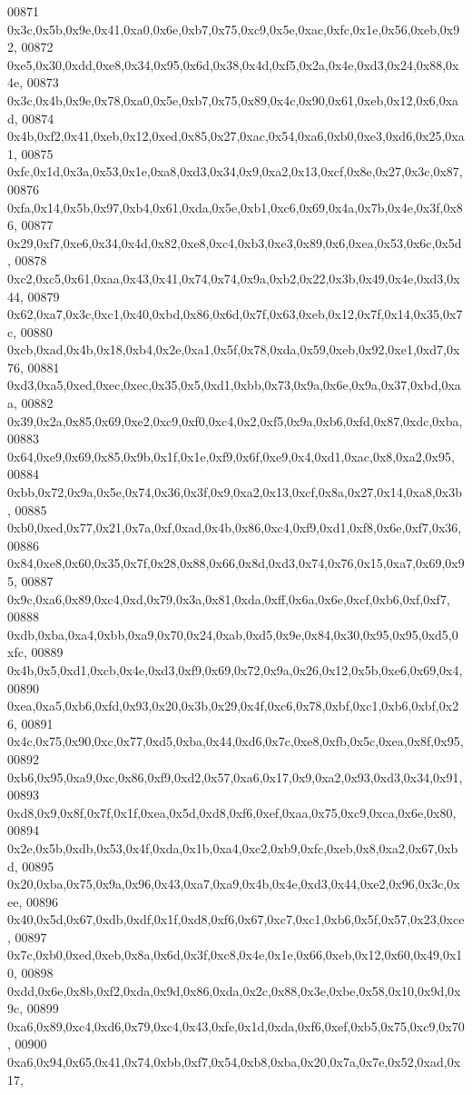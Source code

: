 \begin{DoxyCode}
00871   0x3c,0x5b,0x9e,0x41,0xa0,0x6e,0xb7,0x75,0xc9,0x5e,0xac,0xfc,0x1e,0x56,0xeb,0x92,
00872   0xe5,0x30,0xdd,0xe8,0x34,0x95,0x6d,0x38,0x4d,0xf5,0x2a,0x4e,0xd3,0x24,0x88,0x4e,
00873   0x3c,0x4b,0x9e,0x78,0xa0,0x5e,0xb7,0x75,0x89,0x4c,0x90,0x61,0xeb,0x12,0x6,0xad,
00874   0x4b,0xf2,0x41,0xeb,0x12,0xed,0x85,0x27,0xac,0x54,0xa6,0xb0,0xe3,0xd6,0x25,0xa1,
00875   0xfc,0x1d,0x3a,0x53,0x1e,0xa8,0xd3,0x34,0x9,0xa2,0x13,0xcf,0x8e,0x27,0x3c,0x87,
00876   0xfa,0x14,0x5b,0x97,0xb4,0x61,0xda,0x5e,0xb1,0xc6,0x69,0x4a,0x7b,0x4e,0x3f,0x86,
00877   0x29,0xf7,0xe6,0x34,0x4d,0x82,0xe8,0xc4,0xb3,0xe3,0x89,0x6,0xea,0x53,0x6c,0x5d,
00878   0xc2,0xc5,0x61,0xaa,0x43,0x41,0x74,0x74,0x9a,0xb2,0x22,0x3b,0x49,0x4e,0xd3,0x44,
00879   0x62,0xa7,0x3c,0xc1,0x40,0xbd,0x86,0x6d,0x7f,0x63,0xeb,0x12,0x7f,0x14,0x35,0x7c,
00880   0xcb,0xad,0x4b,0x18,0xb4,0x2e,0xa1,0x5f,0x78,0xda,0x59,0xeb,0x92,0xe1,0xd7,0x76,
00881   0xd3,0xa5,0xed,0xec,0xec,0x35,0x5,0xd1,0xbb,0x73,0x9a,0x6e,0x9a,0x37,0xbd,0xaa,
00882   0x39,0x2a,0x85,0x69,0xe2,0xc9,0xf0,0xc4,0x2,0xf5,0x9a,0xb6,0xfd,0x87,0xdc,0xba,
00883   0x64,0xe9,0x69,0x85,0x9b,0x1f,0x1e,0xf9,0x6f,0xe9,0x4,0xd1,0xac,0x8,0xa2,0x95,
00884   0xbb,0x72,0x9a,0x5e,0x74,0x36,0x3f,0x9,0xa2,0x13,0xcf,0x8a,0x27,0x14,0xa8,0x3b,
00885   0xb0,0xed,0x77,0x21,0x7a,0xf,0xad,0x4b,0x86,0xc4,0xf9,0xd1,0xf8,0x6e,0xf7,0x36,
00886   0x84,0xe8,0x60,0x35,0x7f,0x28,0x88,0x66,0x8d,0xd3,0x74,0x76,0x15,0xa7,0x69,0x95,
00887   0x9c,0xa6,0x89,0xc4,0xd,0x79,0x3a,0x81,0xda,0xff,0x6a,0x6e,0xcf,0xb6,0xf,0xf7,
00888   0xdb,0xba,0xa4,0xbb,0xa9,0x70,0x24,0xab,0xd5,0x9e,0x84,0x30,0x95,0x95,0xd5,0xfc,
00889   0x4b,0x5,0xd1,0xcb,0x4e,0xd3,0xf9,0x69,0x72,0x9a,0x26,0x12,0x5b,0xe6,0x69,0x4,
00890   0xea,0xa5,0xb6,0xfd,0x93,0x20,0x3b,0x29,0x4f,0xc6,0x78,0xbf,0xc1,0xb6,0xbf,0x26,
00891   0x4c,0x75,0x90,0xc,0x77,0xd5,0xba,0x44,0xd6,0x7c,0xe8,0xfb,0x5c,0xea,0x8f,0x95,
00892   0xb6,0x95,0xa9,0xc,0x86,0xf9,0xd2,0x57,0xa6,0x17,0x9,0xa2,0x93,0xd3,0x34,0x91,
00893   0xd8,0x9,0x8f,0x7f,0x1f,0xea,0x5d,0xd8,0xf6,0xef,0xaa,0x75,0xc9,0xca,0x6e,0x80,
00894   0x2e,0x5b,0xdb,0x53,0x4f,0xda,0x1b,0xa4,0xc2,0xb9,0xfc,0xeb,0x8,0xa2,0x67,0xbd,
00895   0x20,0xba,0x75,0x9a,0x96,0x43,0xa7,0xa9,0x4b,0x4e,0xd3,0x44,0xe2,0x96,0x3c,0xee,
00896   0x40,0x5d,0x67,0xdb,0xdf,0x1f,0xd8,0xf6,0x67,0xc7,0xc1,0xb6,0x5f,0x57,0x23,0xce,
00897   0x7c,0xb0,0xed,0xeb,0x8a,0x6d,0x3f,0xc8,0x4e,0x1e,0x66,0xeb,0x12,0x60,0x49,0x10,
00898   0xdd,0x6e,0x8b,0xf2,0xda,0x9d,0x86,0xda,0x2c,0x88,0x3e,0xbe,0x58,0x10,0x9d,0x9c,
00899   0xa6,0x89,0xc4,0xd6,0x79,0xc4,0x43,0xfe,0x1d,0xda,0xf6,0xef,0xb5,0x75,0xc9,0x70,
00900   0xa6,0x94,0x65,0x41,0x74,0xbb,0xf7,0x54,0xb8,0xba,0x20,0x7a,0x7e,0x52,0xad,0x17,

\end{DoxyCode}
